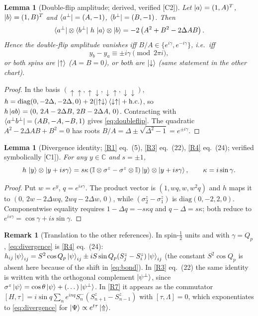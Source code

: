 \documentclass[11pt,a4paper]{article}
\newtheorem{lemma}[theorem]{Lemma}
\theoremstyle{definition}
\newtheorem{remark}[theorem]{Remark}
\newcommand{\ver}[1]{\textsf{[#1]}}   %
\begin{document}
\begin{lemma}[Double-flip amplitude; derived, verified \ver{C2}]\label{lem:doubleflip}
Let $\ket{a}=(1,A)^T$, $\ket b=(1,B)^T$ and $\bra{a^\perp}=(A,-1)$, $\bra{b^\perp}=(B,-1)$. Then
\begin{equation}\label{eq:doubleflip}
\bra{a^\perp}\otimes\bra{b^\perp}\,h\,\ket a\otimes\ket b=-2\left(A^2+B^2-2\Delta AB\right).
\end{equation}
Hence the double-flip amplitude vanishes iff $B/A\in\{e^{i\gamma},e^{-i\gamma}\}$, i.e.\ iff
\begin{equation}\label{eq:pitch}
y_b-y_a\equiv\pm i\gamma\pmod{2\pi i},
\end{equation}
or both spins are $\ket\uparrow$ ($A=B=0$), or both are $\ket\downarrow$ (same statement in the other chart).
\end{lemma}
\begin{proof}
In the basis $(\uparrow\uparrow,\uparrow\downarrow,\downarrow\uparrow,\downarrow\downarrow)$, $h=\mathrm{diag}(0,-2\Delta,-2\Delta,0)+2(\ket{\uparrow\downarrow}\bra{\downarrow\uparrow}+\mathrm{h.c.})$, so $h\ket{ab}=(0,\,2A-2\Delta B,\,2B-2\Delta A,\,0)$. Contracting with $\bra{a^\perp b^\perp}=(AB,-A,-B,1)$ gives \eqref{eq:doubleflip}. The quadratic $A^2-2\Delta AB+B^2=0$ has roots $B/A=\Delta\pm\sqrt{\Delta^2-1}=e^{\pm i\gamma}$.
\end{proof}

\begin{lemma}[Divergence identity; \ref{R1} eq.~(5), \ref{R3} eq.~(22), \ref{R4} eq.~(24); verified symbolically \ver{C1}]\label{lem:divergence}
For any $y\in\mathbb C$ and $s=\pm1$,
\begin{equation}\label{eq:divergence}
h\,\ket{y}\otimes\ket{y+is\gamma}=s\kappa\left(\mathbb{I}\otimes\sigma^z-\sigma^z\otimes\mathbb{I}\right)\ket{y}\otimes\ket{y+is\gamma},\qquad \kappa=i\sin\gamma .
\end{equation}
\end{lemma}
\begin{proof}
Put $w=e^y$, $q=e^{is\gamma}$. The product vector is $(1,wq,w,w^2q)$ and $h$ maps it to $(0,\,2w-2\Delta wq,\,2wq-2\Delta w,\,0)$, while $(\sigma^z_2-\sigma^z_1)$ is $\mathrm{diag}(0,-2,2,0)$. Componentwise equality requires $1-\Delta q=-s\kappa q$ and $q-\Delta=s\kappa$; both reduce to $e^{is\gamma}=\cos\gamma+is\sin\gamma$.
\end{proof}

\begin{remark}[Translation to the other references]
In spin-$\frac12$ units and with $\gamma=Q_p$, \eqref{eq:divergence} is \ref{R4} eq.~(24): $h_{ij}\ket{\psi}_{ij}=S^2\cos Q_p\ket\psi_{ij}\pm iS\sin Q_p(S^z_j-S^z_i)\ket\psi_{ij}$ (the constant $S^2\cos Q_p$ is absent here because of the shift in \eqref{eq:bond}). In \ref{R3} eq.~(22) the same identity is written with the orthogonal complement $\ket{\psi^\perp}$, since $\sigma^z\ket\psi=\cos\theta\ket\psi+(\dots)\ket{\psi^\perp}$. In \ref{R7} it appears as the commutator $[H,\tau]=i\sin q\sum_ne^{inq}S_n^-(S^z_{n+1}-S^z_{n-1})$ with $[\tau,\Lambda]=0$, which exponentiates to \eqref{eq:divergence} for $\ket{\Psi}\propto e^{t\tau}\ket\Uparrow$.
\end{remark}
\end{document}
